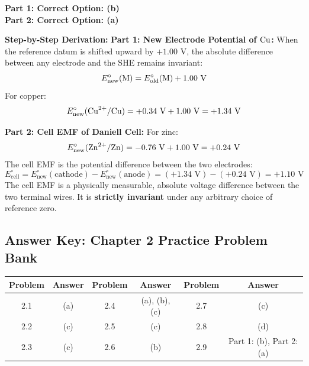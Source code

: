\begin{solution}
\textbf{Part 1: Correct Option: (b)} \\
\textbf{Part 2: Correct Option: (a)}

\textbf{Step-by-Step Derivation:}
\textbf{Part 1: New Electrode Potential of $\ce{Cu}$:}
When the reference datum is shifted upward by $+1.00\text{ V}$, the absolute difference between any electrode and the SHE remains invariant:
\begin{equation*}
    E^\circ_{\text{new}}(\ce{M}) = E^\circ_{\text{old}}(\ce{M}) + 1.00\text{ V}
\end{equation*}
For copper:
\begin{equation*}
    E^\circ_{\text{new}}(\ce{Cu^2+/Cu}) = +0.34\text{ V} + 1.00\text{ V} = +1.34\text{ V}
\end{equation*}

\textbf{Part 2: Cell EMF of Daniell Cell:}
For zinc:
\begin{equation*}
    E^\circ_{\text{new}}(\ce{Zn^2+/Zn}) = -0.76\text{ V} + 1.00\text{ V} = +0.24\text{ V}
\end{equation*}
The cell EMF is the potential difference between the two electrodes:
\begin{equation*}
    E^\circ_{\text{cell}} = E^\circ_{\text{new}}(\text{cathode}) - E^\circ_{\text{new}}(\text{anode}) = (+1.34\text{ V}) - (+0.24\text{ V}) = +1.10\text{ V}
\end{equation*}
The cell EMF is a physically measurable, absolute voltage difference between the two terminal wires. It is \textbf{strictly invariant} under any arbitrary choice of reference zero.
\end{solution}

\ifshowsolutions
\else
\newpage
\subsection*{Answer Key: Chapter 2 Practice Problem Bank}

\begin{center}
\renewcommand{\arraystretch}{1.3}
\begin{tabular}{|c|c||c|c||c|c|}
\hline
\textbf{Problem} & \textbf{Answer} & \textbf{Problem} & \textbf{Answer} & \textbf{Problem} & \textbf{Answer} \\
\hline
2.1 & (a) & 2.4 & (a), (b), (c) & 2.7 & (c) \\
2.2 & (c) & 2.5 & (c) & 2.8 & (d) \\
2.3 & (c) & 2.6 & (b) & 2.9 & Part 1: (b), Part 2: (a) \\
\hline
\end{tabular}
\end{center}
\fi
